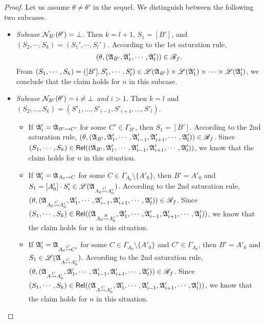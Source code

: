 \begin{proof}
Let us assume $\theta \neq \theta'$ in the sequel. We distinguish between the following two subcases. 
\begin{itemize}
    \item \emph{Subcase $\mathcal{N}_{B'}(\theta') = \bot$}. Then $k=l+1$, $S_1=[B']$, and $(S_2,\cdots,S_k)=(S_1',\cdots,S_l')$.  According to the 1st saturation rule, 
    $$(\theta, ({\mathfrak{A} }_{B'}, {\mathfrak{A} }_1', \cdots, {\mathfrak{A} }_l')) \in \mathscr{R}_f.$$
   From $(S_1, \cdots, S_k) = ([B'], S_1', \cdots, S_l') \in {\mathscr{L} }({\mathfrak{A} }_{B'}) \times {\mathscr{L} }({\mathfrak{A} }_1') \times \cdots \times {\mathscr{L} }({\mathfrak{A} }_l')$, we conclude that the claim holds for $n$ in this subcase.
    \item \emph{Subcase $\mathcal{N}_{B'}(\theta') = i \neq \bot$ and $i > 1$}. Then $k = l$ and $(S_2, \dots, S_k) = (S'_1, \dots, S'_{i-1}, S'_{i+1}, \dots, S'_l)$. 
\begin{itemize}
\item If ${\mathfrak{A} }'_i = {\mathfrak{A} }_{B' \rightsquigarrow C'}$ for some $C' \in \Gamma_{B'}$, then $S_1 = [B']$. According to the 2nd saturation rule, $(\theta, ({\mathfrak{A} }_{B'}, {\mathfrak{A} }'_1, \cdots, {\mathfrak{A} }'_{i-1}, {\mathfrak{A} }'_{i+1}, \cdots, {\mathfrak{A} }'_l)) \in \mathscr{R}_f$. Since $(S_1, \cdots, S_k) \in \mathsf{Rel}(({\mathfrak{A} }_{B'}, {\mathfrak{A} }'_1, \cdots, {\mathfrak{A} }'_{i-1}, {\mathfrak{A} }'_{i+1}, \cdots, {\mathfrak{A} }'_l))$, we know that the claim holds for $n$ in this situation.
%
\item If ${\mathfrak{A} }'_i = {\mathfrak{A} }_{A_0 \rightsquigarrow C}$ for some $C \in \Gamma_{A_0} \setminus \{A'_0\}$, then $B' = A'_0$ and $S_1 = [A'_0] \cdot S'_i \in {\mathscr{L} }({\mathfrak{A} }_{A_0 \stackrel{C}{\rightsquigarrow} A'_0})$.  According to the 2nd saturation rule, $(\theta, ({\mathfrak{A} }_{A_0 \stackrel{C}{\rightsquigarrow} A'_0}, {\mathfrak{A} }'_1, \cdots, {\mathfrak{A} }'_{i-1}, {\mathfrak{A} }'_{i+1}, \cdots, {\mathfrak{A} }'_l)) \in \mathscr{R}_f$. Since $(S_1, \cdots, S_k) \in \mathsf{Rel}(({\mathfrak{A} }_{A_0 \stackrel{B}{\rightsquigarrow} A'_0}, {\mathfrak{A} }'_1, \cdots, {\mathfrak{A} }'_{i-1}, {\mathfrak{A} }'_{i+1}, \cdots, {\mathfrak{A} }'_l))$, we know that the claim holds for $n$ in this situation.

%
\item If ${\mathfrak{A} }'_i = {\mathfrak{A} }_{A_0 \stackrel{C}{\rightsquigarrow} C'}$ for some $C \in \Gamma_{A_0} \setminus \{A'_0\}$ and $C' \in \Gamma_{A_0}$, then $B' = A'_0$ and $S_1 \in  {\mathscr{L} }({\mathfrak{A} }_{A \stackrel{C}{\rightsquigarrow} A'_0})$.  According to the 2nd saturation rule, $(\theta, ({\mathfrak{A} }_{A \stackrel{C}{\rightsquigarrow} A'_0}, {\mathfrak{A} }'_1, \cdots, {\mathfrak{A} }'_{i-1}, {\mathfrak{A} }'_{i+1}, \cdots, {\mathfrak{A} }'_l)) \in \mathscr{R}_f$. Since $(S_1, \cdots, S_k) \in \mathsf{Rel}(({\mathfrak{A} }_{A \stackrel{C}{\rightsquigarrow} A'_0}, {\mathfrak{A} }'_1, \cdots, {\mathfrak{A} }'_{i-1}, {\mathfrak{A} }'_{i+1}, \cdots, {\mathfrak{A} }'_l))$, we know that the claim holds for $n$ in this situation.
\end{itemize}
\end{itemize}
 

\end{proof}
